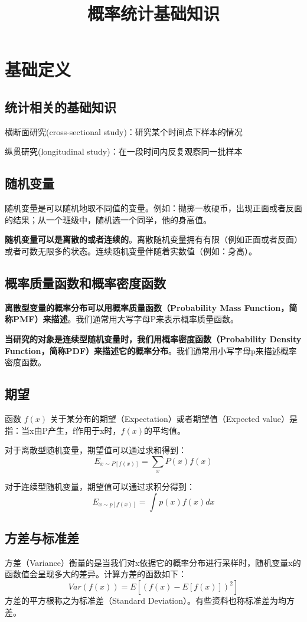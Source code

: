 \documentclass[12pt]{article}
\title{概率统计基础知识\cite{Common_Probability_Distribution}\cite{Inference_Of_Expectation_Variations}}
\begin{document}
\maketitle
\tableofcontents

\section{基础定义}
\subsection{统计相关的基础知识}
横断面研究(cross-sectional study)：研究某个时间点下样本的情况

纵贯研究(longitudinal study)：在一段时间内反复观察同一批样本\cite{Think_Stats}

\subsection{随机变量}
随机变量是可以随机地取不同值的变量。例如：抛掷一枚硬币，出现正面或者反面的结果；从一个班级中，随机选一个同学，他的身高值。

\textbf{随机变量可以是离散的或者连续的}。离散随机变量拥有有限（例如正面或者反面）或者可数无限多的状态。连续随机变量伴随着实数值（例如：身高）。

\subsection{概率质量函数和概率密度函数}
\textbf{离散型变量的概率分布可以用概率质量函数（Probability Mass Function，简称PMF）来描述}。我们通常用大写字母P来表示概率质量函数。

\textbf{当研究的对象是连续型随机变量时，我们用概率密度函数（Probability Density Function，简称PDF）来描述它的概率分布}。我们通常用小写字母p来描述概率密度函数。

\subsection{期望}
函数 $f(x)$ 关于某分布的期望（Expectation）或者期望值（Expected value）是指：当x由P产生，f作用于x时，$f(x)$的平均值。

对于离散型随机变量，期望值可以通过求和得到：
$$
E_{x \sim P[f(x)]} = \sum_xP(x)f(x)
$$

对于连续型随机变量，期望值可以通过求积分得到：
$$
E_{x \sim p[f(x)]} = \int p(x)f(x) dx
$$

\subsection{方差与标准差}
方差（Variance）衡量的是当我们对x依据它的概率分布进行采样时，随机变量x的函数值会呈现多大的差异。计算方差的函数如下：
$$
Var(f(x)) = E[(f(x)-E[f(x)])^2]
$$
方差的平方根称之为标准差（Standard Deviation）。有些资料也称标准差为均方差。
\end{document}

